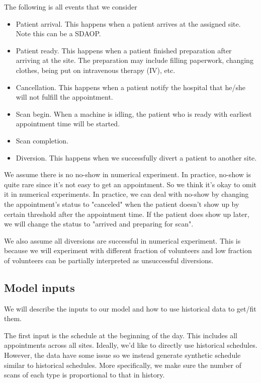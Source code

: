 The following is all events that we consider
\begin{itemize}
\item Patient arrival. This happens when a patient arrives at
      the assigned site. Note this can be a SDAOP.
\item Patient ready. This happens when a patient finished preparation
      after arriving at the site. The preparation may include filling
      paperwork, changing clothes, being put on intravenous therapy (IV),
      etc.
\item Cancellation. This happens when a patient notify the hospital
      that he/she will not fulfill the appointment.
\item Scan begin. When a machine is idling, the patient who is ready
      with earliest appointment time will be started.
\item Scan completion.
\item Diversion. This happens when we successfully divert a patient
      to another site. 
\end{itemize}
We assume there is no no-show in numerical experiment. In practice,
no-show is quite rare since it's not easy to get an appointment. So we think it's
okay to omit it in numerical experiments. In practice, we can deal
with no-show by changing the appointment's status to "canceled"
when the patient doesn't show up by certain threshold after
the appointment time. If the patient does show up later, we will
change the status to "arrived and preparing for scan".

We also assume all diversions are successful in numerical experiment.
This is because we will experiment with different fraction of volunteers
and low fraction of volunteers can be partially interpreted as
unsuccessful diversions.

\subsection{Model inputs}

We will describe the inputs to our model and how to use historical
data to get/fit them.

The first input is the schedule at the beginning of the day.
This includes all appointments across all sites. Ideally, we'd
like to directly use historical schedules. However, the data have
some issue so we instead generate synthetic schedule similar to
historical schedules. More specifically, we make sure the number
of scans of each type is proportional to that in history.

